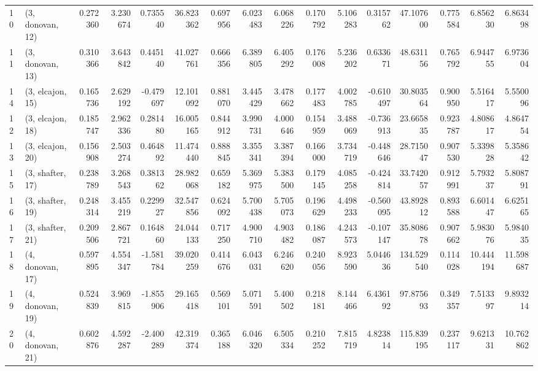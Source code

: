 \begin{tabular}{llrrrrrrrrrrrrrr}
10 &  (3, donovan, 12) &   0.272360 &  3.230674 &  0.735540 &  36.823362 &  0.697956 &   6.023483 &  6.068226 &  0.170792 &  5.106283 &  0.315762 &   47.107600 &  0.775584 &   6.856230 &   6.863498 \\
11 &  (3, donovan, 13) &   0.310366 &  3.643842 &  0.445140 &  41.027761 &  0.666356 &   6.389805 &  6.405292 &  0.176008 &  5.236202 &  0.633671 &   48.631156 &  0.765792 &   6.944755 &   6.973604 \\
14 &  (3, elcajon, 15) &   0.165736 &  2.629192 & -0.479697 &  12.101092 &  0.881070 &   3.445429 &  3.478662 &  0.177483 &  4.002785 & -0.610497 &   30.803564 &  0.900950 &   5.516417 &   5.550096 \\
12 &  (3, elcajon, 18) &   0.185747 &  2.962336 &  0.281480 &  16.005165 &  0.844912 &   3.990731 &  4.000646 &  0.154959 &  3.488069 & -0.736913 &   23.665835 &  0.923787 &   4.808617 &   4.864754 \\
13 &  (3, elcajon, 20) &   0.156908 &  2.503274 &  0.464892 &  11.474440 &  0.888845 &   3.355341 &  3.387394 &  0.166000 &  3.734719 & -0.448646 &   28.715047 &  0.907530 &   5.339828 &   5.358642 \\
15 &  (3, shafter, 17) &   0.238789 &  3.268543 &  0.381362 &  28.982068 &  0.659182 &   5.369975 &  5.383500 &  0.179145 &  4.085258 & -0.424814 &   33.742057 &  0.912991 &   5.793237 &   5.808791 \\
16 &  (3, shafter, 19) &   0.248314 &  3.455219 &  0.229927 &  32.547856 &  0.624092 &   5.700438 &  5.705073 &  0.196629 &  4.498233 & -0.560095 &   43.892812 &  0.893588 &   6.601447 &   6.625165 \\
17 &  (3, shafter, 21) &   0.209506 &  2.867721 &  0.164860 &  24.044133 &  0.717250 &   4.900710 &  4.903482 &  0.186087 &  4.243573 & -0.107147 &   35.808678 &  0.907662 &   5.983076 &   5.984035 \\
18 &  (4, donovan, 17) &   0.597895 &  4.554347 & -1.581784 &  39.020259 &  0.414676 &   6.043031 &  6.246620 &  0.240056 &  8.923590 &  5.044636 &  134.529540 &  0.114028 &  10.444194 &  11.598687 \\
19 &  (4, donovan, 19) &   0.524839 &  3.969815 & -1.855906 &  29.165418 &  0.569101 &   5.071591 &  5.400502 &  0.218181 &  8.144466 &  6.436192 &   97.875693 &  0.349357 &   7.513397 &   9.893214 \\
20 &  (4, donovan, 21) &   0.602876 &  4.592287 & -2.400289 &  42.319374 &  0.365188 &   6.046320 &  6.505334 &  0.210252 &  7.815719 &  4.823814 &  115.839195 &  0.237117 &   9.621331 &  10.762862 \\

\end{tabular}

